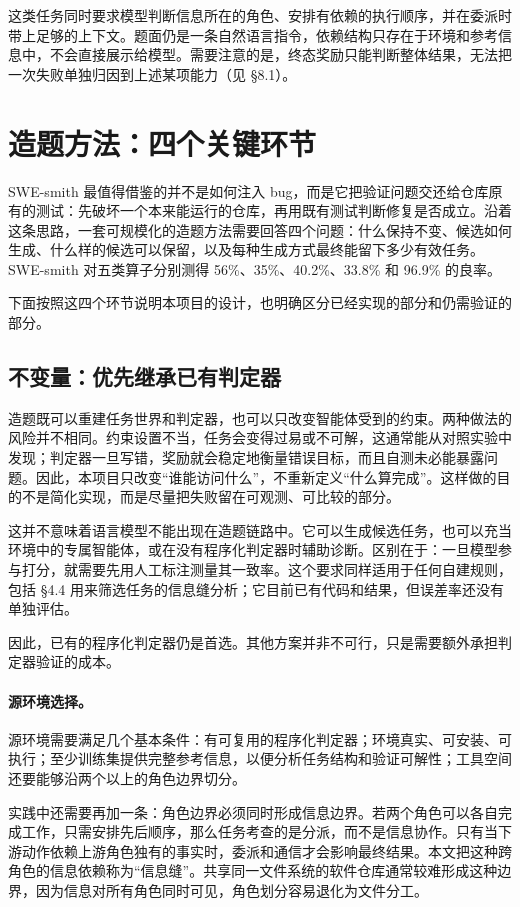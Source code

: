 \documentclass[UTF8,11pt,fontset=fandol]{ctexart}
\begin{document}
这类任务同时要求模型判断信息所在的角色、安排有依赖的执行顺序，并在委派时带上足够的上下文。题面仍是一条自然语言指令，依赖结构只存在于环境和参考信息中，不会直接展示给模型。需要注意的是，终态奖励只能判断整体结果，无法把一次失败单独归因到上述某项能力（见 \S8.1）。

\section{造题方法：四个关键环节}

SWE-smith 最值得借鉴的并不是如何注入 bug，而是它把验证问题交还给仓库原有的测试：先破坏一个本来能运行的仓库，再用既有测试判断修复是否成立\cite{yang2025swesmith}。沿着这条思路，一套可规模化的造题方法需要回答四个问题：什么保持不变、候选如何生成、什么样的候选可以保留，以及每种生成方式最终能留下多少有效任务。SWE-smith 对五类算子分别测得 56\%、35\%、40.2\%、33.8\% 和 96.9\% 的良率。

下面按照这四个环节说明本项目的设计，也明确区分已经实现的部分和仍需验证的部分。

\subsection{不变量：优先继承已有判定器}

造题既可以重建任务世界和判定器，也可以只改变智能体受到的约束。两种做法的风险并不相同。约束设置不当，任务会变得过易或不可解，这通常能从对照实验中发现；判定器一旦写错，奖励就会稳定地衡量错误目标，而且自测未必能暴露问题。因此，本项目只改变“谁能访问什么”，不重新定义“什么算完成”。这样做的目的不是简化实现，而是尽量把失败留在可观测、可比较的部分。

这并不意味着语言模型不能出现在造题链路中。它可以生成候选任务，也可以充当环境中的专属智能体，或在没有程序化判定器时辅助诊断。区别在于：一旦模型参与打分，就需要先用人工标注测量其一致率。这个要求同样适用于任何自建规则，包括 \S4.4 用来筛选任务的信息缝分析；它目前已有代码和结果，但误差率还没有单独评估。

因此，已有的程序化判定器仍是首选。其他方案并非不可行，只是需要额外承担判定器验证的成本。

\paragraph{源环境选择。}
源环境需要满足几个基本条件：有可复用的程序化判定器；环境真实、可安装、可执行；至少训练集提供完整参考信息，以便分析任务结构和验证可解性；工具空间还要能够沿两个以上的角色边界切分。

实践中还需要再加一条：角色边界必须同时形成信息边界。若两个角色可以各自完成工作，只需安排先后顺序，那么任务考查的是分派，而不是信息协作。只有当下游动作依赖上游角色独有的事实时，委派和通信才会影响最终结果。本文把这种跨角色的信息依赖称为“信息缝”。共享同一文件系统的软件仓库通常较难形成这种边界，因为信息对所有角色同时可见，角色划分容易退化为文件分工。
\end{document}
